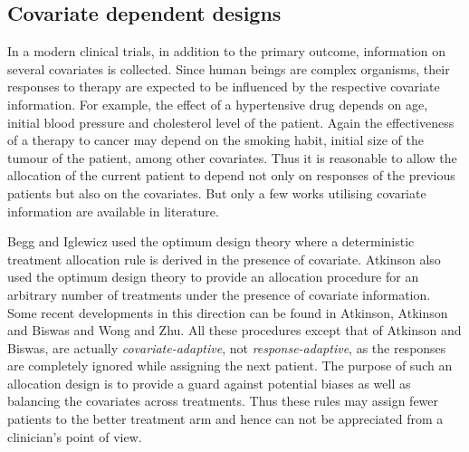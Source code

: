\subsection{Covariate dependent designs}

In a modern clinical trials, in addition to the primary
outcome, information on several covariates is collected. Since human
beings are complex organisms, their responses to therapy are
expected to be influenced by the respective covariate information.
For example, the effect of a hypertensive drug depends on age,
initial blood pressure and cholesterol level of the patient. Again
the effectiveness of a therapy to cancer may depend on the smoking
habit, initial size of the tumour of the patient, among other covariates. Thus it is reasonable to allow the allocation
of the current patient to depend not only on responses of the
previous patients but also on the covariates. But only a few works
utilising covariate information are available in literature.

Begg and Iglewicz\cite{54} used the optimum design theory where a deterministic treatment allocation rule is derived in the
presence of covariate. Atkinson\cite{55} also used the optimum design
theory to provide an allocation procedure for an arbitrary number of
treatments under the presence of covariate information. Some recent
developments in this direction can be found in Atkinson\cite{56,57}, Atkinson and Biswas\cite{58} and Wong and Zhu\cite{59}. All these procedures except that of Atkinson and Biswas\cite{58}, are actually \textit{covariate-adaptive}, not \textit{response-adaptive}, as
the responses are completely ignored while assigning the next
patient. The purpose of such an allocation design is to provide a
guard against potential biases as well as balancing the covariates
across treatments. Thus these rules may assign fewer patients to the
better treatment arm and hence can not be appreciated from a
clinician's point of view.


